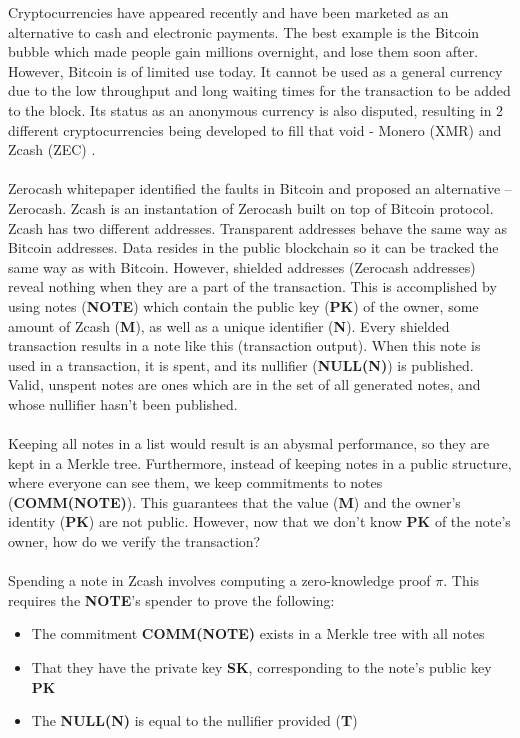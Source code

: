 Cryptocurrencies have appeared recently and have been marketed as an alternative to cash and electronic payments. The best example is the Bitcoin bubble which made people gain millions overnight, and lose them soon after. However, Bitcoin is of limited use today. It cannot be used as a general currency due to the low throughput and long waiting times for the transaction to be added to the block. Its status as an anonymous currency is also disputed, resulting in 2 different cryptocurrencies being developed to fill that void - Monero (XMR) \cite{monero} and Zcash (ZEC) \cite{zcashmain}.\\
\\
Zerocash whitepaper \cite{sasson2014zerocash} identified the faults in Bitcoin and proposed an alternative -- Zerocash. Zcash is an instantation of Zerocash built on top of Bitcoin protocol.  Zcash has two different addresses. Transparent addresses behave the same way as Bitcoin addresses. Data resides in the public blockchain so it can be tracked the same way as with Bitcoin. However, shielded addresses (Zerocash addresses) reveal nothing when they are a part of the transaction. This is accomplished by using notes (\textbf{NOTE}) which contain the public key (\textbf{PK}) of the owner, some amount of Zcash (\textbf{M}), as well as a unique identifier (\textbf{N}). Every shielded transaction results in a note like this (transaction output). When this note is used in a transaction, it is spent, and its nullifier (\textbf{NULL(N)}) is published. Valid, unspent notes are ones which are in the set of all generated notes, and whose nullifier hasn't been published.\\
\\
Keeping all notes in a list would result is an abysmal performance, so they are kept in a Merkle tree. Furthermore, instead of keeping notes in a public structure, where everyone can see them, we keep commitments to notes (\textbf{COMM(NOTE)}). This guarantees that the value (\textbf{M}) and the owner's identity (\textbf{PK}) are not public. However, now that we don't know \textbf{PK} of the note's owner, how do we verify the transaction?\\
\\
Spending a note in Zcash involves computing a zero-knowledge proof $\pi$. This requires the \textbf{NOTE}'s spender to prove the following:

\begin{itemize}
    \item The commitment \textbf{COMM(NOTE)} exists in a Merkle tree with all notes
    \item That they have the private key \textbf{SK}, corresponding to the note's public key \textbf{PK}
    \item The \textbf{NULL(N)} is equal to the nullifier provided (\textbf{T})
\end{itemize}

